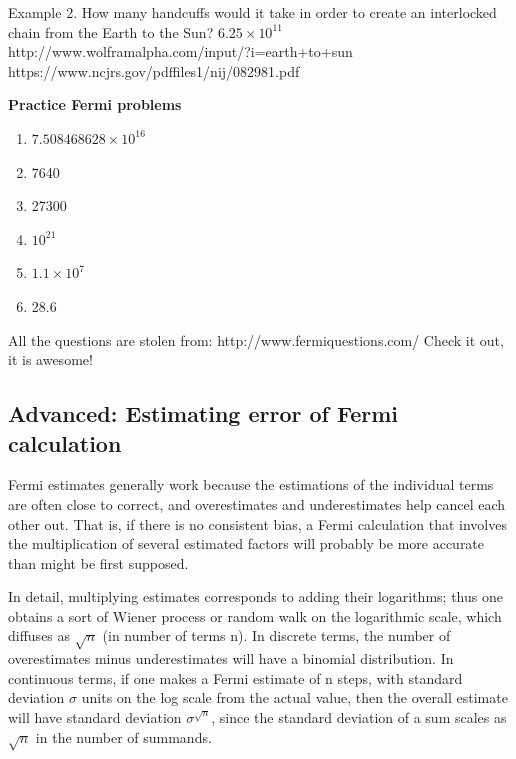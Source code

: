 \documentclass[pdftex, 12pt, a4paper]{report}
\begin{document}
	\noindent Example 2. How many handcuffs would it take in order to create an interlocked chain from the Earth to the Sun?  $6.25 \times 10^{11}$\newline
	\noindent	http://www.wolframalpha.com/input/?i=earth+to+sun \newline
	https://www.ncjrs.gov/pdffiles1/nij/082981.pdf \newline\newline
	
	
	\noindent\textbf{Practice Fermi problems}
	\begin{enumerate}
		\item $7.508468628\times10^{16}$
		\item 7640
		\item 27300
		\item $10^{21}$
		\item $1.1\times10^7$
		\item 28.6
	\end{enumerate}

	\noindent All the questions are stolen from: http://www.fermiquestions.com/ \newline\newline
	Check it out, it is awesome!
	\subsection{Advanced: Estimating error of Fermi calculation}
	Fermi estimates generally work because the estimations of the individual terms are often close to correct, and overestimates and underestimates help cancel each other out. That is, if there is no consistent bias, a Fermi calculation that involves the multiplication of several estimated factors will probably be more accurate than might be first supposed. \par 
	
	In detail, multiplying estimates corresponds to adding their logarithms; thus one obtains a sort of Wiener process or random walk on the logarithmic scale, which diffuses as $\sqrt{n}$ (in number of terms n). In discrete terms, the number of overestimates minus underestimates will have a binomial distribution. In continuous terms, if one makes a Fermi estimate of n steps, with standard deviation $\sigma$ units on the log scale from the actual value, then the overall estimate will have standard deviation $\sigma^{\sqrt{n}}$, since the standard deviation of a sum scales as $\sqrt{n}$ in the number of summands. \par
	
\end{document}
